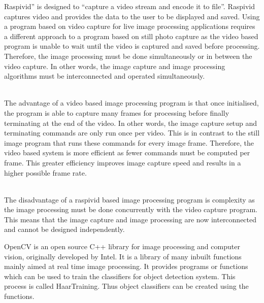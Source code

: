 \documentclass[12pt,a4paper]{report}
\begin{document}
\hspace*{1cm} Raspivid” is designed to “capture a video stream and encode it to file”. Raspivid captures video
and provides the data to the user to be displayed and saved. Using a program based on video
capture for live image processing applications requires a different approach to a program based on
still photo capture as the video based program is unable to wait until the video is captured and
saved before processing. Therefore, the image processing must be done simultaneously or in
between the video capture. In other words, the image capture and image processing algorithms
must be interconnected and operated simultaneously.\\\

\hspace*{1cm} The advantage of a video based image processing program is that once initialised, the program is
able to capture many frames for processing before finally terminating at the end of the video. In
other words, the image capture setup and terminating commands are only run once per video. This
is in contrast to the still image program that runs these commands for every image frame. Therefore,
the video based system is more efficient as fewer commands must be computed per frame. This
greater efficiency improves image capture speed and results in a higher possible frame rate.\\\

\hspace*{1cm} The disadvantage of a raspivid based image processing program is complexity as the image
processing must be done concurrently with the video capture program. This means that the image
capture and image processing are now interconnected and cannot be designed independently.



OpenCV is an open source C++ library for image processing
and computer vision, originally developed by Intel. It is a library of many inbuilt functions mainly aimed at real time image processing. It provides programs or functions which can be used to train the classifiers for object detection system. This process is called HaarTraining. Thus object classifiers can be created using the functions.


\end{document}
